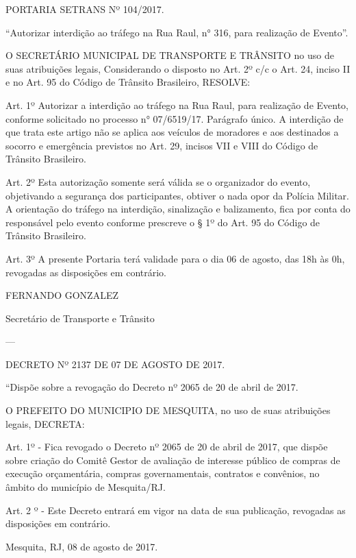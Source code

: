 \documentclass{doliberto}
\begin{document}
 

PORTARIA SETRANS Nº 104/2017. 

“Autorizar  interdição  ao  tráfego  na  Rua  Raul,  n°  316,  para 
realização de Evento”. 
 
O  SECRETÁRIO  MUNICIPAL  DE  TRANSPORTE  E 
TRÂNSITO no uso de suas atribuições legais,  
Considerando o disposto no Art. 2º c/c o Art. 24, inciso II e 
no Art. 95 do Código de Trânsito Brasileiro,  
RESOLVE:  
 
Art. 1º Autorizar a interdição ao tráfego na Rua Raul, para 
realização  de  Evento,  conforme  solicitado  no  processo  n° 
07/6519/17.  
Parágrafo único. A interdição de que trata este artigo não se 
aplica  aos  veículos  de  moradores  e  aos  destinados  a 
socorro e emergência previstos no Art. 29, incisos VII e VIII 
do Código de Trânsito Brasileiro.  
 
Art.  2º  Esta  autorização  somente  será  válida  se  o 
organizador  do  evento,  objetivando  a  segurança  dos 
participantes, obtiver o nada opor da Polícia Militar.  A 
orientação  do  tráfego  na  interdição,  sinalização  e 
balizamento, fica por conta do responsável pelo evento 
conforme  prescreve  o  §  1º  do  Art.  95  do  Código  de 
Trânsito Brasileiro.  
 
Art.  3º  A  presente  Portaria  terá  validade  para  o  dia  06  de 
agosto,  das  18h  às  0h,  revogadas  as  disposições  em 
contrário. 
 

FERNANDO GONZALEZ 

Secretário de Transporte e Trânsito 

---

DECRETO Nº 2137 DE 07 DE AGOSTO DE 2017. 
 
 “Dispõe  sobre  a  revogação  do  Decreto  nº  2065  de  20  de 
abril de 2017.  
 
O  PREFEITO  DO  MUNICIPIO  DE  MESQUITA,  no  uso  de 
suas atribuições legais,  
DECRETA: 
 
Art. 1º - Fica revogado o Decreto nº 2065 de 20 de abril de 
2017,  que  dispõe  sobre  criação  do  Comitê  Gestor  de 
avaliação  de  interesse  público  de  compras  de  execução 
orçamentária,  compras  governamentais,  contratos  e 
convênios, no âmbito do município de Mesquita/RJ. 
 
Art.  2  º  -  Este  Decreto  entrará  em  vigor  na  data  de  sua 
publicação, revogadas as disposições em contrário. 

 
Mesquita, RJ, 08 de agosto de 2017. 
\end{document}

